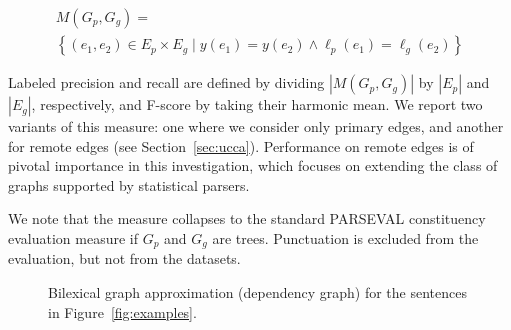 \documentclass[11pt,a4paper]{article}
\newcommand{\secref}[1]{Section~\ref{#1}}
\newcommand{\figref}[1]{Figure~\ref{#1}}
\begin{document}
\vspace{-.6cm}

{\small
\begin{multline*}
    M(G_p,G_g) = \\
    \left\{(e_1,e_2) \in E_p \times E_g \;|\;
    y(e_1) = y(e_2) \wedge \ell_p(e_1)=\ell_g(e_2)\right\}
\end{multline*}
}

\vspace{-.6cm}

Labeled precision and recall are defined by dividing $|M(G_p,G_g)|$ by $|E_p|$ and $|E_g|$, respectively,
and F-score by taking their harmonic mean.
We report two variants of this measure: one where we consider only primary edges,
and another for remote edges (see \secref{sec:ucca}).
Performance on remote edges is of pivotal importance in this investigation,
which focuses on extending the class of graphs supported by statistical parsers.

We note that the measure collapses to the standard
PARSEVAL constituency evaluation measure if $G_p$ and $G_g$ are trees.
Punctuation is excluded from the evaluation, but not from the datasets.

\begin{figure}
	\centering
	\caption{Bilexical graph approximation (dependency graph) for the sentences in \figref{fig:examples}.}
	\label{fig:bilexical_example}
\end{figure}
\end{document}
